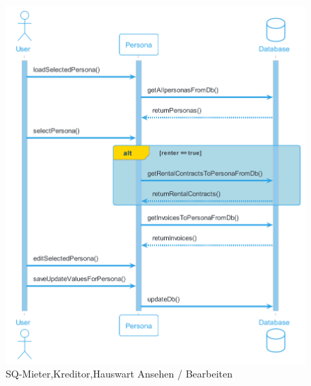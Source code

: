 \begin{figure}[H]
  \begin{center}
    \includegraphics[width=0.65\textheight]{content/diagrams/out/sequenzdiagram/personAnsehen/personAnsehen.png}
    \caption{SQ-Mieter,Kreditor,Hauswart Ansehen / Bearbeiten}
  \end{center}
\end{figure}

